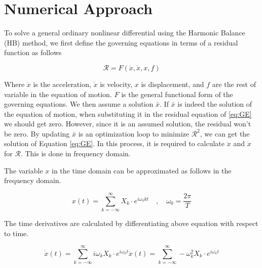\documentclass[12pt, a4paper]{extarticle}
\begin{document}
\section{Numerical Approach}

To solve a general ordinary nonlinear differential using the Harmonic Balance (HB) method, we first define the governing equations in terms of a residual function as follows

\begin{equation}\label{eq:GE}
	\mathcal{R} = F(\ddot{x}, \dot{x}, x, f)
\end{equation}

Where $\ddot{x}$ is the acceleration, $\dot{x}$ is velocity, $x$ is displacement, and $f$ are the rest of variable in the equation of motion. $F$ is the general functional form of the governing equations. We then assume a solution $\bar{x}$. If $\bar{x}$ is indeed the solution of the equation of motion, when substituting it in the residual equation of \eqref{eq:GE} we should get zero. However, since it is an assumed solution, the residual won't be zero. By updating $\bar{x}$ is an optimization loop to minimize $\mathcal{R}^2$, we can get the solution of Equation \eqref{eq:GE}. In this process, it is required to calculate $\ddot{x}$ and $\dot{x}$ for $\mathcal{R}$. This is done in frequency domain.

The variable $x$ in the time domain can be approximated as follows in the frequency domain.

\begin{equation}\label{eq:displacement}
	x(t) = 
	\sum_{k=-\infty}^{\infty}
	X_k \cdot e^{i \omega_0 k t} \quad , \quad \omega_0 = \frac{2\pi}{T}
\end{equation}

The time derivatives are calculated by differentiating above equation with respect to time.

\begin{subequations}
\begin{equation}\label{eq:velocity}
	\dot{x}(t) = \sum_{k=-\infty}^{\infty} i \omega_k X_k \cdot e^{i \omega_k t}
\end{equation}
\begin{equation}\label{eq:acceleration}
	\ddot{x}(t) = \sum_{k=-\infty}^{\infty} -\omega_k^2 X_k \cdot e^{i \omega_k t}
\end{equation}
\end{subequations}
\end{document}
